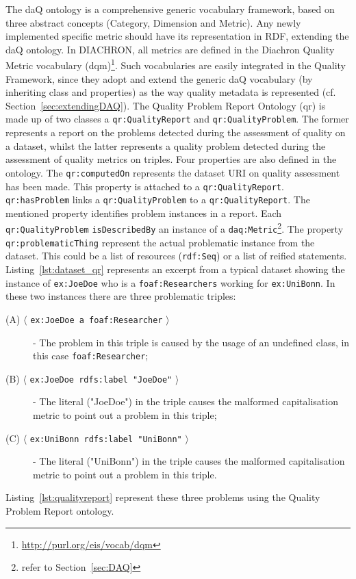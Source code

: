 The daQ ontology is a comprehensive generic vocabulary framework, based on three abstract concepts (Category, Dimension and Metric). 
Any newly implemented specific metric should have its representation in RDF, extending the daQ ontology. In DIACHRON, all metrics are defined in the Diachron Quality Metric vocabulary (dqm)\footnote{\url{http://purl.org/eis/vocab/dqm}}. 
Such vocabularies are easily integrated in the Quality Framework, since they adopt and extend the generic daQ vocabulary (by inheriting class and properties) as the way quality metadata is represented (cf. Section~\ref{sec:extendingDAQ}).
The Quality Problem Report Ontology (qr) is made up of two classes a \texttt{qr:QualityReport} and \texttt{qr:QualityProblem}. 
The former represents a report on the problems detected during the assessment of quality on a dataset, whilst the latter represents a quality problem detected during the assessment of quality metrics on triples. 
Four properties are also defined in the ontology. 
The \texttt{qr:computedOn} represents the dataset URI on quality assessment has been made. 
This property is attached to a \texttt{qr:QualityReport}. \texttt{qr:hasProblem} links a \texttt{qr:QualityProblem} to a \texttt{qr:QualityReport}. 
The mentioned property identifies problem instances in a report. 
Each \texttt{qr:QualityProblem} \texttt{isDescribedBy} an instance of a \texttt{daq:Metric}\footnote{refer to Section~\ref{sec:DAQ}}. 
The property \texttt{qr:problematicThing} represent the actual problematic instance from the dataset. This could be a list of resources (\texttt{rdf:Seq}) or a list of reified statements.
Listing~\ref{lst:dataset_qr} represents an excerpt from a typical dataset showing the instance of \texttt{ex:JoeDoe} who is a \texttt{foaf:Researchers} working for \texttt{ex:UniBonn}.
In these two instances there are three problematic triples:
\begin{description}
\item [(A) $\langle$ \texttt{ex:JoeDoe a foaf:Researcher} $\rangle$] - The problem in this triple is caused by the usage of an undefined class, in this case \texttt{foaf:Researcher};
\item [(B) $\langle$ \texttt{ex:JoeDoe rdfs:label "JoeDoe"} $\rangle$] - The literal ("JoeDoe") in the triple causes the malformed capitalisation metric to point out a problem in this triple;
\item [(C) $\langle$ \texttt{ex:UniBonn rdfs:label "UniBonn"} $\rangle$] - The literal ("UniBonn") in the triple causes the malformed capitalisation metric to point out a problem in this triple.
\end{description}
Listing~\ref{lst:qualityreport} represent these three problems using the Quality Problem Report ontology.



